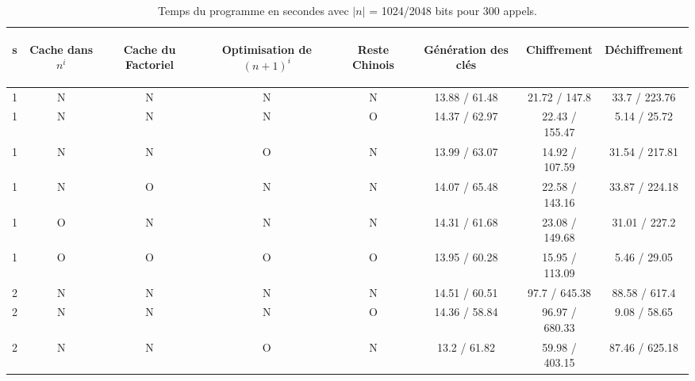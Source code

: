 \begin{table}[hlc]
\center
\caption{Temps du programme en secondes avec $|n|$ = 1024/2048 bits pour 300 appels.}
\begin{tabular}{|c |c|c|c|c| |c | c|c|}
\hline
\begin{sideways}s\end{sideways}&%
\begin{sideways}Cache dans $n^i$\end{sideways}&%
\begin{sideways}Cache du Factoriel\end{sideways}&%
\begin{sideways}Optimisation de $(n+1)^i$\end{sideways}&%
\begin{sideways}Reste Chinois\end{sideways}&%
\begin{sideways}G\'en\'eration des cl\'es\end{sideways}&%
\begin{sideways}Chiffrement\end{sideways}&%
\begin{sideways}D\'echiffrement\end{sideways}\\%
\hline
\hline
1 & N& N& N& N & 13.88 / 61.48 & 21.72 / 147.8 & 33.7 / 223.76 \\
1 & N& N& N& O & 14.37 / 62.97 & 22.43 / 155.47 & 5.14 / 25.72 \\
1 & N& N& O& N & 13.99 / 63.07 & 14.92 / 107.59 & 31.54 / 217.81 \\
1 & N& O& N& N & 14.07 / 65.48 & 22.58 / 143.16 & 33.87 / 224.18 \\
1 & O& N& N& N & 14.31 / 61.68 & 23.08 / 149.68 & 31.01 / 227.2 \\
1 & O& O& O& O & 13.95 / 60.28 & 15.95 / 113.09 & 5.46 / 29.05 \\
\hline
\hline
2 & N& N& N& N & 14.51 / 60.51 & 97.7 / 645.38 & 88.58 / 617.4 \\
2 & N& N& N& O & 14.36 / 58.84 & 96.97 / 680.33 & 9.08 / 58.65 \\
2 & N& N& O& N & 13.2 / 61.82 & 59.98 / 403.15 & 87.46 / 625.18 \\

\end{tabular}
\end{table}
